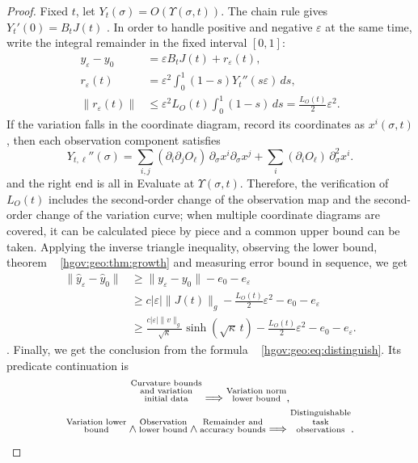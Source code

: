 \documentclass[12pt,a4paper,openany,notitlepage]{report}
\theoremstyle{plain}
\theoremstyle{definition}
\theoremstyle{remark}
\def\mathcal#1{#1}\def\mathsf#1{#1}\def\mathbb#1{#1}%
\begin{document}
\begin{CJK*}
\begin{proof}
Fixed $t$, let $Y_t(\sigma)=\mathcal O(\Upsilon(\sigma,t))$. The chain rule gives $Y_t'(0)=B_tJ(t)$ . In order to handle positive and negative $\varepsilon$ at the same time, write the integral remainder in the fixed interval $[0,1]$: \[
\begin{aligned}
y_\varepsilon-y_0
&=\varepsilon B_tJ(t)+r_\varepsilon(t),\\
r_\varepsilon(t)
&=\varepsilon^2\int_0^1(1-s)Y_t''(s\varepsilon)\,ds,\\
\lVert r_\varepsilon(t)\rVert
&\le\varepsilon^2L_{\mathcal O}(t)\int_0^1(1-s)\,ds
=\frac{L_{\mathcal O}(t)}2\varepsilon^2.
\end{aligned}
\] If the variation falls in the coordinate diagram, record its coordinates as $x^i(\sigma,t)$, then each observation component satisfies \[
Y_{t,\ell}''(\sigma)
=\sum_{i,j}(\partial_i\partial_j\mathcal O_\ell)
\,\partial_\sigma x^i\partial_\sigma x^j
+\sum_i(\partial_i\mathcal O_\ell)\,\partial_\sigma^2x^i.
\] and the right end is all in Evaluate at $\Upsilon(\sigma,t)$. Therefore, the verification of $L_{\mathcal O}(t)$ includes the second-order change of the observation map and the second-order change of the variation curve; when multiple coordinate diagrams are covered, it can be calculated piece by piece and a common upper bound can be taken. Applying the inverse triangle inequality, observing the lower bound, theorem ~ \ref{hgov:geo:thm:growth} and measuring error bound in sequence, we get \[
\begin{aligned}
\lVert\widehat y_\varepsilon-\widehat y_0\rVert
&\ge\lVert y_\varepsilon-y_0\rVert-e_0-e_\varepsilon\\
&\ge c|\varepsilon|\lVert J(t)\rVert_g
-\frac{L_{\mathcal O}(t)}2\varepsilon^2-e_0-e_\varepsilon\\
&\ge\frac{c|\varepsilon|\lVert v\rVert_g}{\sqrt\kappa}
\sinh(\sqrt\kappa\,t)
-\frac{L_{\mathcal O}(t)}2\varepsilon^2-e_0-e_\varepsilon.
\end{aligned}
\]. Finally, we get the conclusion from the formula ~ \eqref{hgov:geo:eq:distinguish}. Its predicate continuation is \[
\begin{gathered}
\text{\shortstack[c]{\scriptsize Curvature bounds\\[-1pt]\scriptsize and variation\\[-1pt]\scriptsize initial data}}
\Longrightarrow\text{\shortstack[c]{\scriptsize Variation norm\\[-1pt]\scriptsize lower bound}},\\
\text{\shortstack[c]{\scriptsize Variation lower\\[-1pt]\scriptsize bound}}\land\text{\shortstack[c]{\scriptsize Observation\\[-1pt]\scriptsize lower bound}}\land\text{\shortstack[c]{\scriptsize Remainder and\\[-1pt]\scriptsize accuracy bounds}}
\Longrightarrow\text{\shortstack[c]{\scriptsize Distinguishable\\[-1pt]\scriptsize task\\[-1pt]\scriptsize observations}}.
\end{gathered}
\]\end{proof}



\end{CJK*}
\end{document}
